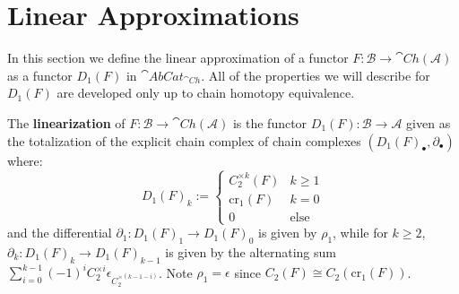\section{Linear Approximations}


In this section we define the linear approximation of a functor $F:\mathcal{B}\rightarrow \cat{Ch}(\mathcal{A})$ as a functor $D_1(F)$ in $\cat{AbCat}_{\cat{Ch}}$. All of the properties we will describe for $D_1(F)$ are developed only up to  chain homotopy equivalence.

\begin{defn}[label=defn:linearization]
    The \textbf{linearization} of $F:\mathcal{B}\rightarrow \cat{Ch}(\mathcal{A})$ is the functor $D_1(F):\mathcal{B}\rightarrow \mathcal{A}$ given as the totalization of the explicit chain complex of chain complexes $(D_1(F)_\bullet,\partial_\bullet)$ where:
    \begin{equation*}
        D_1(F)_k := \left\{\begin{array}{cc} C_2^{\times k}(F) & k \geq 1 \\ \text{cr}_1(F) & k = 0 \\ 0 & \text{else} \end{array}\right.
    \end{equation*}
    and the differential $\partial_1:D_1(F)_1\rightarrow D_1(F)_0$ is given by $\rho_1$, while for $k \geq 2$, $\partial_k:D_1(F)_k\rightarrow D_1(F)_{k-1}$ is given by the alternating sum $\sum_{i=0}^{k-1}(-1)^iC_2^{\times i}\epsilon_{C_2^{\times (k-1-i)}}$. Note $\rho_1 = \epsilon$ since $C_2(F) \cong C_2(\text{cr}_1(F))$.
\end{defn}